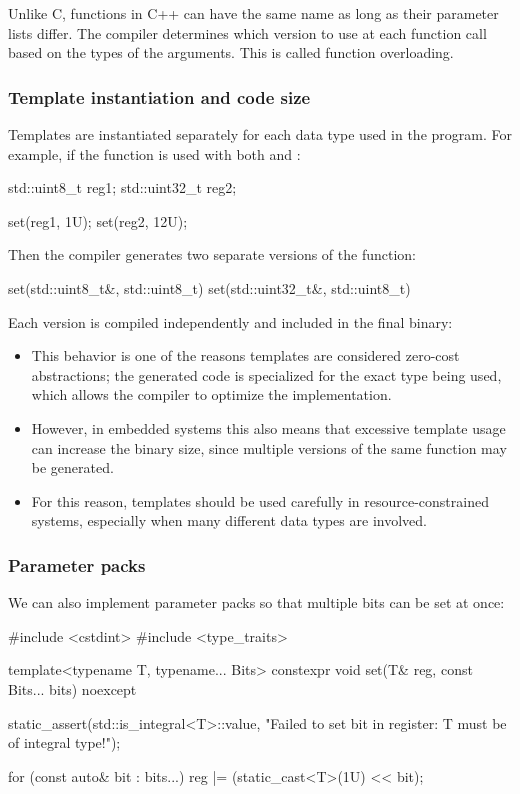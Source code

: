 \note Unlike C, functions in C++ can have the same name as long as their parameter lists differ.
The compiler determines which version to use at each function call based on the types of the
arguments. This is called function overloading.

\subsubsection{Template instantiation and code size}
Templates are instantiated separately for each data type used in the program. For example, if the
function  is used with both  and :

\begin{cppcode}
std::uint8_t reg1{};
std::uint32_t reg2{};

set(reg1, 1U);
set(reg2, 12U);
\end{cppcode}

\noindent Then the compiler generates two separate versions of the function:

\begin{cppcode}
set(std::uint8_t&, std::uint8_t)
set(std::uint32_t&, std::uint8_t)
\end{cppcode}

\noindent Each version is compiled independently and included in the final binary:
\begin{itemize}
  \item This behavior is one of the reasons templates are considered zero-cost abstractions; the
    generated code is specialized for the exact type being used, which allows the compiler to
    optimize the implementation.
  \item However, in embedded systems this also means that excessive template usage can increase
    the binary size, since multiple versions of the same function may be generated.
  \item For this reason, templates should be used carefully in resource-constrained systems,
    especially when many different data types are involved.
\end{itemize}

\subsubsection{Parameter packs}
We can also implement parameter packs so that multiple bits can be set at once:

\begin{cppcode}
#include <cstdint>
#include <type_traits>

template<typename T, typename... Bits>
constexpr void set(T& reg, const Bits... bits) noexcept
{
    static_assert(std::is_integral<T>::value,
        "Failed to set bit in register: T must be of integral type!");

    for (const auto& bit : {bits...})
    {
        reg |= (static_cast<T>(1U) << bit);
    }
}
\end{cppcode}

